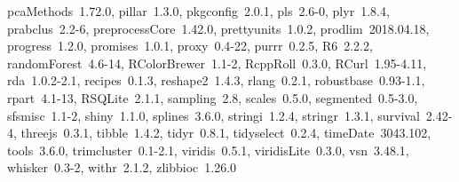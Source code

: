\documentclass[12pt]{article}\usepackage[]{graphicx}\usepackage[]{color}
\begin{document}
\begin{appendices}
\begin{itemize}
    pcaMethods~1.72.0, pillar~1.3.0, pkgconfig~2.0.1, pls~2.6-0,
    plyr~1.8.4, prabclus~2.2-6, preprocessCore~1.42.0,
    prettyunits~1.0.2, prodlim~2018.04.18, progress~1.2.0,
    promises~1.0.1, proxy~0.4-22, purrr~0.2.5, R6~2.2.2,
    randomForest~4.6-14, RColorBrewer~1.1-2, RcppRoll~0.3.0,
    RCurl~1.95-4.11, rda~1.0.2-2.1, recipes~0.1.3, reshape2~1.4.3,
    rlang~0.2.1, robustbase~0.93-1.1, rpart~4.1-13, RSQLite~2.1.1,
    sampling~2.8, scales~0.5.0, segmented~0.5-3.0, sfsmisc~1.1-2,
    shiny~1.1.0, splines~3.6.0, stringi~1.2.4, stringr~1.3.1,
    survival~2.42-4, threejs~0.3.1, tibble~1.4.2, tidyr~0.8.1,
    tidyselect~0.2.4, timeDate~3043.102, tools~3.6.0,
    trimcluster~0.1-2.1, viridis~0.5.1, viridisLite~0.3.0,
    vsn~3.48.1, whisker~0.3-2, withr~2.1.2, zlibbioc~1.26.0
\end{itemize}


\end{appendices}



\end{document}
